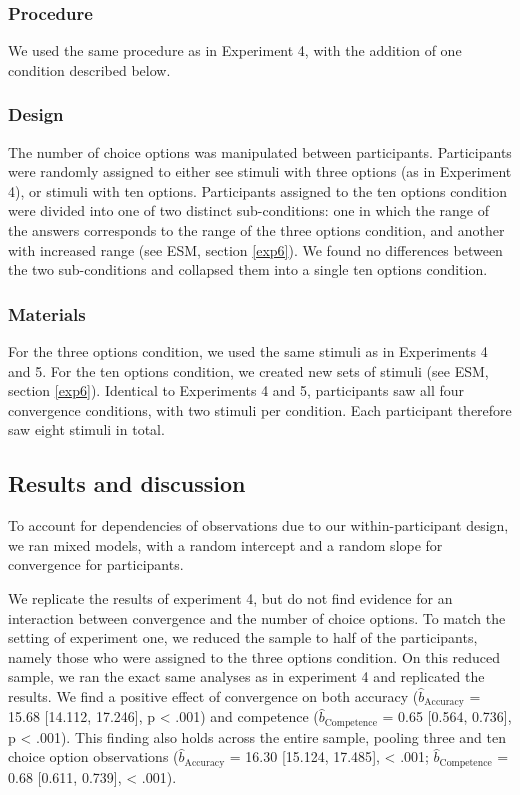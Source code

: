 \documentclass[
  doc,floatsintext]{apa6}
\begin{document}
\subsubsection{Procedure}\label{procedure-4}

We used the same procedure as in Experiment 4, with the addition of one condition described below.

\subsubsection{Design}\label{design-5}

The number of choice options was manipulated between participants. Participants were randomly assigned to either see stimuli with three options (as in Experiment 4), or stimuli with ten options. Participants assigned to the ten options condition were divided into one of two distinct sub-conditions: one in which the range of the answers corresponds to the range of the three options condition, and another with increased range (see ESM, section \ref{exp6}). We found no differences between the two sub-conditions and collapsed them into a single ten options condition.

\subsubsection{Materials}\label{materials-5}

For the three options condition, we used the same stimuli as in Experiments 4 and 5. For the ten options condition, we created new sets of stimuli (see ESM, section \ref{exp6}). Identical to Experiments 4 and 5, participants saw all four convergence conditions, with two stimuli per condition. Each participant therefore saw eight stimuli in total.

\subsection{Results and discussion}\label{results-and-discussion-5}

To account for dependencies of observations due to our within-participant design, we ran mixed models, with a random intercept and a random slope for convergence for participants.

We replicate the results of experiment 4, but do not find evidence for an interaction between convergence and the number of choice options. To match the setting of experiment one, we reduced the sample to half of the participants, namely those who were assigned to the three options condition. On this reduced sample, we ran the exact same analyses as in experiment 4 and replicated the results. We find a positive effect of convergence on both accuracy (\(\hat{b}_{\text{Accuracy}}\) = 15.68 {[}14.112, 17.246{]}, p \textless{} .001) and competence (\(\hat{b}_{\text{Competence}}\) = 0.65 {[}0.564, 0.736{]}, p \textless{} .001). This finding also holds across the entire sample, pooling three and ten choice option observations (\(\hat{b}_{\text{Accuracy}}\) = 16.30 {[}15.124, 17.485{]}, \textless{} .001; \(\hat{b}_{\text{Competence}}\) = 0.68 {[}0.611, 0.739{]}, \textless{} .001).
\end{document}
